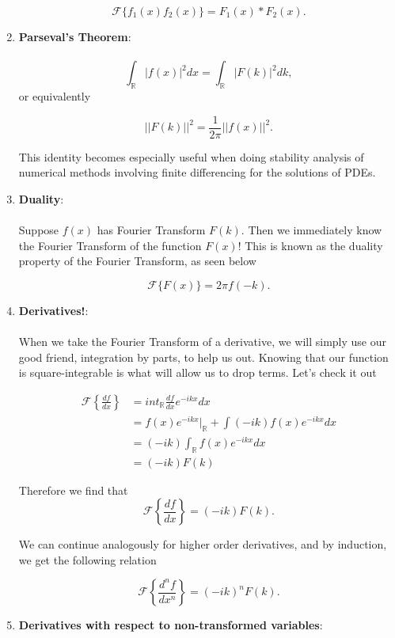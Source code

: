 \begin{enumerate}
$$\mathscr{F}\{ f_1(x)f_2(x)  \} = F_1(x) \ast F_2(x).$$

\item {\bf{Parseval's Theorem}}: \\ \\

$$\int_{\mathbb{R}} | f(x) |^2 dx = \int_{\mathbb{R}} | F(k) |^2 dk,$$ or equivalently

$$||F(k)||^2 = \frac{1}{2\pi} ||f(x)||^2.$$

This identity becomes especially useful when doing stability analysis of numerical methods involving finite differencing for the solutions of PDEs.

\item {\bf{Duality}}: \\ \\

Suppose $f(x)$ has Fourier Transform $F(k)$. Then we immediately know the Fourier Transform of the function $F(x)$! This is known as the duality property of the Fourier Transform, as seen below

$$\mathscr{F}\{ F(x) \} = 2\pi f(-k).$$

\item {\bf{Derivatives!}}:\\ \\

When we take the Fourier Transform of a derivative, we will simply use our good friend, integration by parts, to help us out. Knowing that our function is square-integrable is what will allow us to drop terms. Let's check it out

\begin{align*}
\mathscr{F}\left\{\frac{df}{dx} \right\} &= int_{\mathbb{R}} \frac{df}{dx} e^{-ikx} dx \\
&= f(x)  e^{-ikx} \Big|_{\mathbb{R}} +  \int (-ik) f(x) e^{-ikx} dx \\
&= (-ik) \int_{\mathbb{R}} f(x) e^{-ikx} dx \\
&= (-ik) F(k)
\end{align*}

Therefore we find that $$\mathscr{F}\left\{\frac{df}{dx} \right\}  = (-ik) F(k).$$

We can continue analogously for higher order derivatives, and by induction, we get the following relation

$$\mathscr{F}\left\{ \frac{d^n f}{dx^n}  \right\} = (-ik)^n F(k).$$

%
%
\item {\bf{Derivatives with respect to non-transformed variables}}:\\ \\


\end{enumerate}
